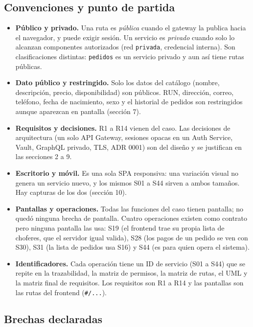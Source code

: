 \subsection{Convenciones y punto de partida}

\begin{itemize}[nosep,leftmargin=*]
\item \textbf{Público y privado.} Una ruta es \emph{pública} cuando el gateway la publica hacia el navegador, y puede exigir sesión. Un servicio es \emph{privado} cuando solo lo alcanzan componentes autorizados (red \texttt{privada}, credencial interna). Son clasificaciones distintas: \texttt{pedidos} es un servicio privado y aun así tiene rutas públicas.
\item \textbf{Dato público y restringido.} Solo los datos del catálogo (nombre, descripción, precio, disponibilidad) son públicos. RUN, dirección, correo, teléfono, fecha de nacimiento, sexo y el historial de pedidos son restringidos aunque aparezcan en pantalla (sección 7).
\item \textbf{Requisitos y decisiones.} R1 a R14 vienen del caso. Las decisiones de arquitectura (un solo API Gateway, sesiones opacas en un Auth Service, Vault, GraphQL privado, TLS, ADR 0001) son del diseño y se justifican en las secciones 2 a 9.
\item \textbf{Escritorio y móvil.} Es una sola SPA responsiva: una variación visual no genera un servicio nuevo, y los mismos S01 a S44 sirven a ambos tamaños. Hay capturas de los dos (sección 10).
\item \textbf{Pantallas y operaciones.} Todas las funciones del caso tienen pantalla; no quedó ninguna brecha de pantalla. Cuatro operaciones existen como contrato pero ninguna pantalla las usa: S19 (el frontend trae su propia lista de choferes, que el servidor igual valida), S28 (los pagos de un pedido se ven con S30), S31 (la lista de pedidos usa S16) y S44 (es para quien opera el sistema).
\item \textbf{Identificadores.} Cada operación tiene un ID de servicio (S01 a S44) que se repite en la trazabilidad, la matriz de permisos, la matriz de rutas, el UML y la matriz final de requisitos. Los requisitos son R1 a R14 y las pantallas son las rutas del frontend (\texttt{\#/\allowbreak{}.\allowbreak{}.\allowbreak{}.\allowbreak{}}).
\end{itemize}

\subsection{Brechas declaradas}

